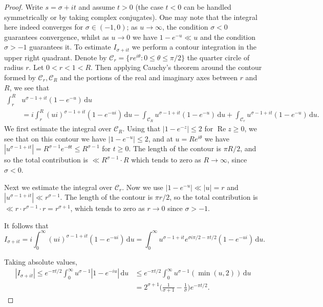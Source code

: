 \documentclass[11pt,reqno]{amsart}
\numberwithin{equation}{section}
\theoremstyle{definition}
\theoremstyle{remark}
\newcommand{\on}{\operatorname}
\renewcommand{\le}{\leqslant}
\renewcommand{\ge}{\geqslant}
\renewcommand{\Re}{\on{Re}}
\begin{document}
\begin{proof}
 
 Write $s = \sigma + it$ and assume $t > 0$ (the case $t < 0$ can be handled symmetrically or by taking complex conjugates). One may note that the integral here indeed converges for $\sigma \in (-1,0)$; as $u \rightarrow \infty$, the condition $\sigma < 0$ guarantees convergence, whilst as $u \rightarrow 0$ we have $1 - e^{-u} \ll u$ and the condition $\sigma > -1$ guarantees it.
To estimate $I_{\sigma+ it}$ we perform a contour integration in the upper right quadrant. Denote by $\mathcal{C}_r = \{ r e^{i \theta} : 0 \le \theta \le \pi/2\}$ the quarter circle of radius $r$. Let $0 < r < 1 < R$. Then applying Cauchy's theorem around the contour formed by $\mathcal{C}_r, \mathcal{C}_R$ and the portions of the real and imaginary axes between $r$ and $R$, we see that 
\begin{align*} \int^R_r & u^{\sigma - 1 + it}(1-e^{-u})\,\mathrm{d}u \\ & = i\int^R_r (u i)^{\sigma - 1 + it} (1 - e^{-u i})\,\mathrm{d}u - \int_{\mathcal{C}_R} u^{\sigma - 1 + it}(1-e^{-u})\,\mathrm{d}u + \int_{\mathcal{C}_r} u^{\sigma - 1 + it}(1-e^{-u})\,\mathrm{d}u . \end{align*}
We first estimate the integral over $\mathcal{C}_R$. Using that $|1 - e^{-z}| \le 2$ for $\Re z \ge 0$, we see that on this contour we have $|1 - e^{-u}| \le 2$, and at $u = R e^{i \theta}$ we have $|u^{\sigma - 1 + it}| = R^{\sigma-1} e^{-\theta t} \le R^{\sigma - 1}$ for $t \ge 0$. The length of the contour is $\pi R/2$, and so the total contribution is $\ll R^{\sigma - 1} \cdot R$ which tends to zero as $R \rightarrow \infty$, since $\sigma < 0$.

Next we estimate the integral over $\mathcal{C}_r$. Now we use $|1 - e^{-u}| \ll |u| = r$ and $|u^{\sigma - 1 + it}| \ll r^{\sigma-1}$. The length of the contour is $\pi r/2$, so the total contribution is $\ll r \cdot r^{\sigma-1} \cdot r = r^{\sigma + 1}$, which tends to zero as $r \rightarrow 0$ since $\sigma > -1$.

It follows that 
\[ I_{\sigma+it} = i \int^{\infty}_0 (u i)^{\sigma - 1 + it} (1 - e^{-u i})\, \mathrm{d}u = \int^{\infty}_0 u^{\sigma - 1 + it}e^{\sigma i\pi/2  - \pi t/2} (1-e^{-ui})\,\mathrm{d}u. \]


Taking absolute values,
\begin{align*} |I_{\sigma+it}| \le e^{-\pi t/2}  \int^{\infty}_0  u^{\sigma-1} |1 - e^{-iu}|\, \mathrm{d}u  & \le e^{-\pi t/2}\int_{0}^{\infty}u^{\sigma-1}(\min(u, 2))\,\mathrm{d}u\\ & =  2^{\sigma + 1}\big(\frac{1}{\sigma+1} - \frac{1}{\sigma}\big) e^{-\pi t/2} .\end{align*} 


\end{proof}
\end{document}
